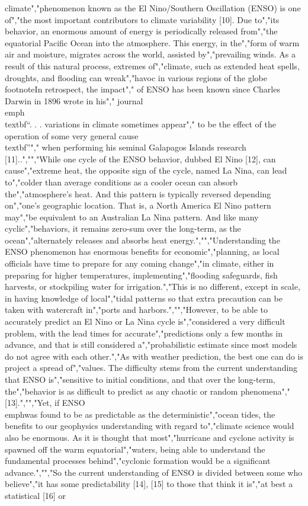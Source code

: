 {{{{{{{{{{climate","phenomenon known as the El Nino/Southern Oscillation (ENSO) is one of","the most important contributors to climate variability {[}10{]}. Due to","its behavior, an enormous amount of energy is periodically released from","the equatorial Pacific Ocean into the atmosphere. This energy, in the","form of warm air and moisture, migrates across the world, assisted by","prevailing winds. As a result of this natural process, extremes of","climate, such as extended heat spells, droughts, and flooding can wreak","havoc in various regions of the globe\\footnote{In retrospect, the impact","  of ENSO has been known since Charles Darwin in 1896 wrote in his","  journal \\emph{\\textbf{``}. . . variations in climate sometimes appear","  to be the effect of the operation of some very general cause\\textbf{''","  }}when performing his seminal Galapagos Islands research {[}11{]}.}.","","While one cycle of the ENSO behavior, dubbed El Nino {[}12{]}, can cause","extreme heat, the opposite sign of the cycle, named La Nina, can lead to","colder than average conditions as a cooler ocean can absorb the","atmosphere's heat. And this pattern is typically reversed depending on","one's geographic location. That is, a North America El Nino pattern may","be equivalent to an Australian La Nina pattern. And like many cyclic","behaviors, it remains zero-sum over the long-term, as the ocean","alternately releases and absorbs heat energy.","","Understanding the ENSO phenomenon has enormous benefits for economic","planning, as local officials have time to prepare for any coming change","in climate, either in preparing for higher temperatures, implementing","flooding safeguards, fish harvests, or stockpiling water for irrigation.","This is no different, except in scale, in having knowledge of local","tidal patterns so that extra precaution can be taken with watercraft in","ports and harbors.","","However, to be able to accurately predict an El Nino or La Nina cycle is","considered a very difficult problem, with the lead times for accurate","predictions only a few months in advance, and that is still considered a","probabilistic estimate since most models do not agree with each other.","As with weather prediction, the best one can do is project a spread of","values. The difficulty stems from the current understanding that ENSO is","sensitive to initial conditions, and that over the long-term, the","behavior is as difficult to predict as any chaotic or random phenomena","{[}13{]}.","","Yet, if ENSO \\emph{was} found to be as predictable as the deterministic","ocean tides, the benefits to our geophysics understanding with regard to","climate science would also be enormous. As it is thought that most","hurricane and cyclone activity is spawned off the warm equatorial","waters, being able to understand the fundamental processes behind","cyclonic formation would be a significant advance.","","So the current understanding of ENSO is divided between some who believe","it has some predictability {[}14{]}, {[}15{]} to those that think it is","at best a statistical {[}16{]} or }}}}}}}}}}
